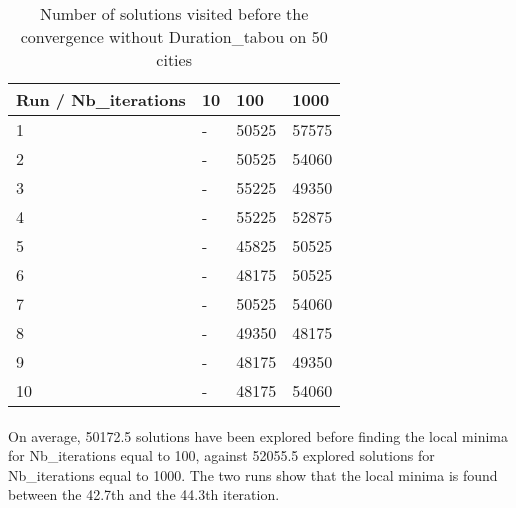 \documentclass[12pt,oneside,a4paper]{article}
\begin{document}
      \begin{table}[h]
        \centering
        \small
        \begin{tabular}{llll}
          \hline
          \multicolumn{1}{|l|}{\textbf{Run / Nb\_iterations}}& \multicolumn{1}{l|}{\textbf{10}} & \multicolumn{1}{l|}{\textbf{100}} & \multicolumn{1}{l|}{\textbf{1000}}\\ \hline
          \multicolumn{1}{|l|}{1} & \multicolumn{1}{l|}{-}  & \multicolumn{1}{l|}{50525}  & \multicolumn{1}{l|}{57575}  \\ \hline
          \multicolumn{1}{|l|}{2} & \multicolumn{1}{l|}{-}  & \multicolumn{1}{l|}{50525}  & \multicolumn{1}{l|}{54060}  \\ \hline         
          \multicolumn{1}{|l|}{3} & \multicolumn{1}{l|}{-}  & \multicolumn{1}{l|}{55225}  & \multicolumn{1}{l|}{49350}  \\ \hline
          \multicolumn{1}{|l|}{4} & \multicolumn{1}{l|}{-}  & \multicolumn{1}{l|}{55225}  & \multicolumn{1}{l|}{52875}  \\ \hline
          \multicolumn{1}{|l|}{5} & \multicolumn{1}{l|}{-}  & \multicolumn{1}{l|}{45825}  & \multicolumn{1}{l|}{50525}  \\ \hline
          \multicolumn{1}{|l|}{6} & \multicolumn{1}{l|}{-}  & \multicolumn{1}{l|}{48175}  & \multicolumn{1}{l|}{50525}  \\ \hline
          \multicolumn{1}{|l|}{7} & \multicolumn{1}{l|}{-}  & \multicolumn{1}{l|}{50525}  & \multicolumn{1}{l|}{54060}  \\ \hline
          \multicolumn{1}{|l|}{8} & \multicolumn{1}{l|}{-}  & \multicolumn{1}{l|}{49350}  & \multicolumn{1}{l|}{48175}  \\ \hline
          \multicolumn{1}{|l|}{9} & \multicolumn{1}{l|}{-}  & \multicolumn{1}{l|}{48175}  & \multicolumn{1}{l|}{49350}  \\ \hline
          \multicolumn{1}{|l|}{10} & \multicolumn{1}{l|}{-}  & \multicolumn{1}{l|}{48175}  & \multicolumn{1}{l|}{54060}  \\ \hline
        \end{tabular}
        \caption{Number of solutions visited before the convergence without Duration\_tabou on 50 cities}
      \end{table}

\paragraph{}
    On average, 50172.5 solutions have been explored before finding the local minima for Nb\_iterations equal to 100, against 52055.5 explored solutions for Nb\_iterations equal to 1000.
    The two runs show that the local minima is found between the 42.7th and the 44.3th iteration. 
\end{document}
